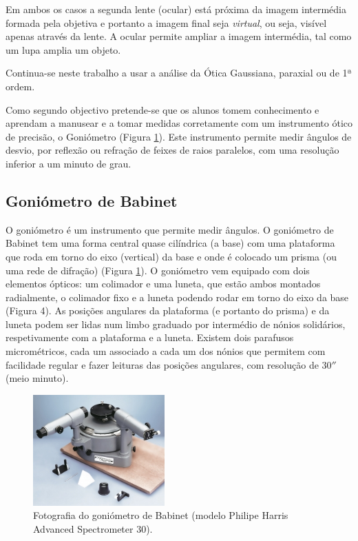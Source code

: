 \documentclass[a4paper,12pt]{article}      %
\begin{document}
Em ambos os casos a segunda lente (ocular) está  próxima da imagem intermédia formada pela objetiva e portanto a imagem final seja \emph{virtual}, ou seja, visível apenas através da lente.
A ocular permite ampliar a imagem intermédia, tal como um lupa amplia
um objeto.
 
 Continua-se neste trabalho a usar a análise da Ótica Gaussiana, paraxial ou de 1ª ordem.


Como segundo objectivo pretende-se que os alunos tomem conhecimento e aprendam a manusear e a tomar medidas corretamente  com um instrumento ótico de precisão, o Goniómetro (Figura \ref{fig:spectrometer}). Este instrumento permite medir ângulos de desvio, por reflexão ou refração de feixes de raios paralelos, com uma resolução inferior a um minuto de grau.

\subsection{\sf Goniómetro de Babinet}
O goniómetro é um instrumento que permite medir ângulos. O goniómetro de Babinet tem uma forma central quase cilíndrica (a base) com uma plataforma que roda em torno do eixo (vertical) da base e onde é colocado um prisma (ou uma rede de difração) (Figura \ref{fig:spectrometer}). O goniómetro vem equipado com dois elementos ópticos: um colimador e uma luneta, que estão ambos montados radialmente, o colimador fixo e a luneta podendo rodar em torno do eixo da base (Figura 4). As posições angulares da plataforma (e portanto do prisma) e da luneta podem ser lidas num limbo graduado por intermédio de nónios solidários, respetivamente com a plataforma e a luneta. Existem dois parafusos micrométricos, cada um associado a cada um dos nónios que permitem com facilidade regular e fazer leituras das posições angulares, com resolução de $30''$ (meio minuto).

\begin{figure}[htb]  
\centering 
	\includegraphics[width=0.45\textwidth]{spectrometer}
	\caption{Fotografia do goniómetro de Babinet (modelo Philipe Harris Advanced Spectrometer 30). \label{fig:spectrometer}} 
\end{figure}
\end{document}
